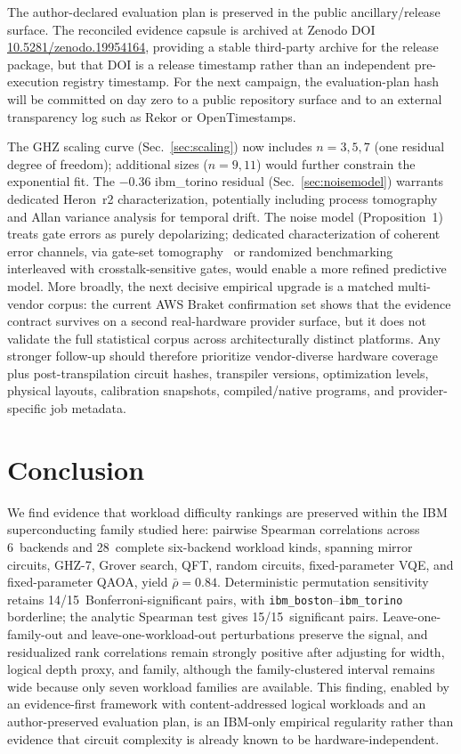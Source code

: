 \documentclass[aps,prxquantum,twocolumn,superscriptaddress,amsmath,amssymb,longbibliography,floatfix]{revtex4-2}
\begin{document}
The author-declared evaluation plan is preserved in the public ancillary/release surface. The reconciled evidence capsule is archived at Zenodo DOI \href{https://doi.org/10.5281/zenodo.19954164}{10.5281/zenodo.19954164}, providing a stable third-party archive for the release package, but that DOI is a release timestamp rather than an independent pre-execution registry timestamp. For the next campaign, the evaluation-plan hash will be committed on day zero to a public repository surface and to an external transparency log such as Rekor or OpenTimestamps.

The GHZ scaling curve (Sec.~\ref{sec:scaling}) now includes $n{=}3,5,7$ (one residual degree of freedom); additional sizes ($n{=}9,11$) would further constrain the exponential fit. The $-0.36$ ibm\_torino residual (Sec.~\ref{sec:noisemodel}) warrants dedicated Heron~r2 characterization, potentially including process tomography and Allan variance analysis for temporal drift. The noise model (Proposition~1) treats gate errors as purely depolarizing; dedicated characterization of coherent error channels, via gate-set tomography~\cite{Merkel2013} or randomized benchmarking interleaved with crosstalk-sensitive gates, would enable a more refined predictive model. More broadly, the next decisive empirical upgrade is a matched multi-vendor corpus: the current AWS Braket confirmation set shows that the evidence contract survives on a second real-hardware provider surface, but it does not validate the full statistical corpus across architecturally distinct platforms. Any stronger follow-up should therefore prioritize vendor-diverse hardware coverage plus post-transpilation circuit hashes, transpiler versions, optimization levels, physical layouts, calibration snapshots, compiled/native programs, and provider-specific job metadata.

\section{Conclusion}
\label{sec:conclusion}

We find evidence that workload difficulty rankings are preserved within the IBM superconducting family studied here: pairwise Spearman correlations across 6~backends and 28~complete six-backend workload kinds, spanning mirror circuits, GHZ-7, Grover search, QFT, random circuits, fixed-parameter VQE, and fixed-parameter QAOA, yield $\bar{\rho} = 0.84$. Deterministic permutation sensitivity retains 14/15~Bonferroni-significant pairs, with \texttt{ibm\_boston}--\texttt{ibm\_torino} borderline; the analytic Spearman test gives 15/15~significant pairs. Leave-one-family-out and leave-one-workload-out perturbations preserve the signal, and residualized rank correlations remain strongly positive after adjusting for width, logical depth proxy, and family, although the family-clustered interval remains wide because only seven workload families are available. This finding, enabled by an evidence-first framework with content-addressed logical workloads and an author-preserved evaluation plan, is an IBM-only empirical regularity rather than evidence that circuit complexity is already known to be hardware-independent.
\end{document}
